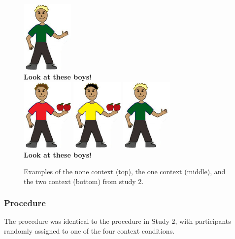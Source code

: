 \documentclass[man]{apa2}
\begin{document}
\begin{figure}
\begin{center}
\includegraphics[width=1in]{figures/apples_context3_nothing.jpg}
\\ {\bf Look at these boys!}
\\
\vspace{1cm}
\includegraphics[width=1in]{figures/apples_context1_item.jpg}
\includegraphics[width=1in]{figures/apples_context2_item.jpg}
\includegraphics[width=1in]{figures/apples_context3_nothing.jpg}
\\ {\bf Look at these boys!}
\caption{\label{fig:addition_subs} Examples of the none context (top), the one context (middle), and the two context (bottom) from study 2. }
\end{center} 
\end{figure}

\subsubsection{Procedure}
 The procedure was identical to the procedure in Study 2, with participants randomly assigned to one of the four context conditions.
\end{document}
